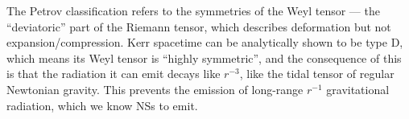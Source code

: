 \documentclass[main.tex]{subfiles}
\begin{document}
The Petrov classification refers to the symmetries of the Weyl tensor --- the ``deviatoric'' part of the Riemann tensor, which describes deformation but not expansion/compression. 
Kerr spacetime can be analytically shown to be type D, which means its Weyl tensor is ``highly symmetric'', and the consequence of this is that the radiation it can emit decays like \(r^{-3}\), like the tidal tensor of regular Newtonian gravity. 
This prevents the emission of long-range \(r^{-1}\) gravitational radiation, which we know NSs to emit.






\end{document}
